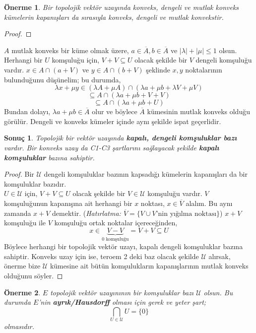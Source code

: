 \documentclass[11pt]{article}
\theoremstyle{plain}
\newtheorem{corollary}{Sonuç}
\newtheorem{proposition}{Önerme}
\theoremstyle{definition}
\theoremstyle{remark}
\numberwithin{equation}{section}
\renewcommand{\%}{{\small \%}}
\begin{document}
\begin{proposition}
Bir topolojik vektör uzayında konveks, dengeli ve mutlak konveks kümelerin kapanışları da sırasıyla konveks, dengeli ve mutlak konvekstir.
\end{proposition}

\begin{proof}

\end{proof}
$A$ mutlak konveks bir küme olmak üzere, $a\in\overline{A}, b\in\overline{A}$ ve $|\lambda|+|\mu|\leq 1$ olsun. Herhangi bir $U$ komşuluğu için, $V+V\subseteq U$ olacak şekilde bir $V$ dengeli komşuluğu vardır. $x\in A\cap(a+V)$ ve $y\in A\cap(b+V)$ şeklinde $x, y$ noktalarının bulunduğunu düşünelim; bu durumda,
\[
\lambda x+\mu y\in\left(\lambda A+\mu A\right)\cap \left(\lambda a+\mu b+\lambda V+\mu V\right)
\]
\[
\subseteq A\cap \left(\lambda a+\mu b+V+V\right)
\]
\[
\subseteq A\cap \left(\lambda a+\mu b+U\right)
\] 
Bundan dolayı, $\lambda a+\mu b\in\overline{A}$ olur ve böylece $\overline{A}$ kümesinin mutlak konveks olduğu görülür. Dengeli ve konveks kümeler içinde aynı şekilde ispat geçerlidir.

\begin{corollary}
Topolojik bir vektör uzayında \textbf{kapalı, dengeli komşuluklar bazı} vardır. Bir konveks uzay da C1-C3 şartlarını sağlayacak şekilde \textbf{kapalı komşuluklar} bazına sahiptir.
\end{corollary}

\begin{proof}
Bir $\mathscr{U}$ dengeli komşuluklar bazının kapsadığı kümelerin kapanışları da bir komşuluklar bazıdır. \\
$U\in\mathscr{U}$ için, $V+V\subseteq U$ olacak şekilde bir $V\in\mathscr{U}$ komşuluğu vardır. $V$ komşuluğunun kapanışına ait herhangi bir $x$ noktası, $x\in\overline{V}$ alalım. Bu aynı zamanda $x+V$ demektir. (\emph{Hatırlatma: $\overline{V}=\{V\cup V\text{'nin yığılma noktası}\}$}) $x+V$ komşuluğu ile $V$ komşuluğu ortak noktalar içereceğinden, 
\[
x\in \underbrace{V-V}_{0\text{ komşuluğu}}=V+V\subseteq U
\]
Böylece herhangi bir topolojik vektör uzayı, kapalı dengeli komşuluklar bazına sahiptir. Konveks uzay için ise, teroem 2 deki baz olacak şekilde $\mathscr{U}$ alırsak, önerme bize $\mathscr{U}$ kümesine ait bütün komşulukların kapanışlarının mutlak konveks olduğunu söyler.
\end{proof}

\begin{proposition}
$E$ topolojik vektör uzayınının bir komşuluklar bazı $\mathscr{U}$ olsun. Bu durumda $E$'nin \textbf{ayrık/Hausdorff} olması için gerek ve yeter şart;
\[
\bigcap_{U\in\mathscr{U}}U=\{0\}
\]
olmasıdır.
\end{proposition}
\end{document}
